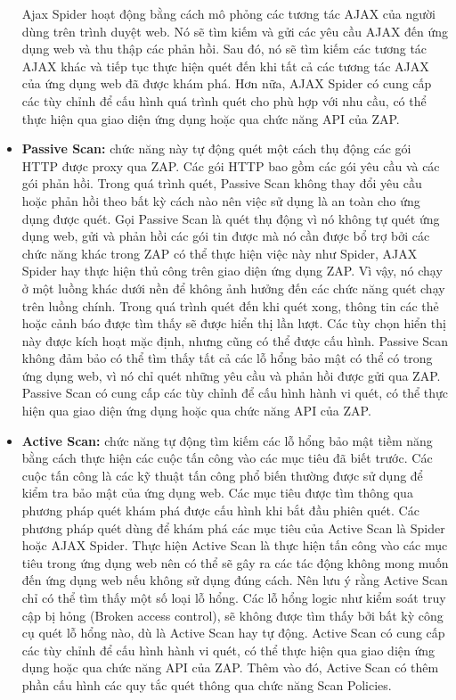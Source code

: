 \begin{itemize}
        \par
        Ajax Spider hoạt động bằng cách mô phỏng các tương tác AJAX của người dùng trên trình duyệt web. Nó sẽ tìm kiếm và gửi các yêu cầu AJAX đến ứng dụng web và thu thập các phản hồi. Sau đó, nó sẽ tìm kiếm các tương tác AJAX khác và tiếp tục thực hiện quét đến khi tất cả các tương tác AJAX của ứng dụng web đã được khám phá. Hơn nữa, AJAX Spider có cung cấp các tùy chỉnh để cấu hình quá trình quét cho phù hợp với nhu cầu, có thể thực hiện qua giao diện ứng dụng hoặc qua chức năng API của ZAP.
  \item \textbf{Passive Scan:} chức năng này tự động quét một cách thụ động các gói HTTP được proxy qua ZAP. Các gói HTTP bao gồm các gói yêu cầu và các gói phản hồi. Trong quá trình quét, Passive Scan không thay đổi yêu cầu hoặc phản hồi theo bất kỳ cách nào nên việc sử dụng là an toàn cho ứng dụng được quét. Gọi Passive Scan là quét thụ động vì nó không tự quét ứng dụng web, gửi và phản hồi các gói tin được mà nó cần được bổ trợ bởi các chức năng khác trong ZAP có thể thực hiện việc này như Spider, AJAX Spider hay thực hiện thủ công trên giao diện ứng dụng ZAP. Vì vậy, nó chạy ở một luồng khác dưới nền để không ảnh hưởng đến các chức năng quét chạy trên luồng chính.
        Trong quá trình quét đến khi quét xong, thông tin các thẻ hoặc cảnh báo được tìm thấy sẽ được hiển thị lần lượt. Các tùy chọn hiển thị này được kích hoạt mặc định, nhưng cũng có thể được cấu hình. Passive Scan không đảm bảo có thể tìm thấy tất cả các lỗ hổng bảo mật có thể có trong ứng dụng web, vì nó chỉ quét những yêu cầu và phản hồi được gửi qua ZAP. Passive Scan có cung cấp các tùy chỉnh để cấu hình hành vi quét, có thể thực hiện qua giao diện ứng dụng hoặc qua chức năng API của ZAP.
  \item \textbf{Active Scan:} chức năng tự động tìm kiếm các lỗ hổng bảo mật tiềm năng bằng cách thực hiện các cuộc tấn công vào các mục tiêu đã biết trước. Các cuộc tấn công là các kỹ thuật tấn công phổ biến thường được sử dụng để kiểm tra bảo mật của ứng dụng web. Các mục tiêu được tìm thông qua phương pháp quét khám phá được cấu hình khi bắt đầu phiên quét. Các phương pháp quét dùng để khám phá các mục tiêu của Active Scan là Spider hoặc AJAX Spider.
        Thực hiện Active Scan là thực hiện tấn công vào các mục tiêu trong ứng dụng web nên có thể sẽ gây ra các tác động không mong muốn đến ứng dụng web nếu không sử dụng đúng cách. Nên lưu ý rằng Active Scan chỉ có thể tìm thấy một số loại lỗ hổng. Các lỗ hổng logic như kiểm soát truy cập bị hỏng (Broken access control), sẽ không được tìm thấy bởi bất kỳ công cụ quét lỗ hổng nào, dù là Active Scan hay tự động. Active Scan có cung cấp các tùy chỉnh để cấu hình hành vi quét, có thể thực hiện qua giao diện ứng dụng hoặc qua chức năng API của ZAP. Thêm vào đó, Active Scan có thêm phần cấu hình các quy tắc quét thông qua chức năng Scan Policies.

\end{itemize}
